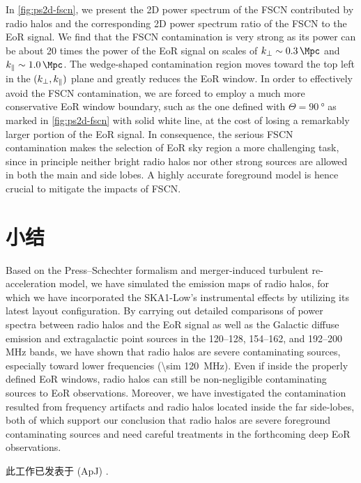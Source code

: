 In \autoref{fig:ps2d-fscn}, we present the 2D power spectrum of the FSCN
contributed by radio halos and the corresponding 2D power spectrum ratio
of the FSCN to the EoR signal.
We find that the FSCN contamination is very strong as its power can be
about 20 times the power of the EoR signal on scales of
$\kperp \sim \SI{0.3}{\per\Mpc}$ and $\klos \sim \SI{1.0}{\per\Mpc}$.
The wedge-shaped contamination region moves toward the top left in
the $(k_{\perp}, k_{\parallel})$ plane and greatly reduces the EoR window.
In order to effectively avoid the FSCN contamination, we are forced to
employ a much more conservative EoR window boundary, such as the one
defined with $\Theta = \SI{90}{\degree}$ as marked in
\autoref{fig:ps2d-fscn} with solid white line, at the cost of losing
a remarkably larger portion of the EoR signal.
In consequence,
the serious FSCN contamination makes the selection of EoR sky region
a more challenging task, since in principle neither bright radio halos
nor other strong sources are allowed in both the main and side lobes.
A highly accurate foreground model is hence crucial to mitigate the
impacts of FSCN.


\section{小结}

Based on the Press--Schechter formalism and merger-induced turbulent
re-acceleration model, we have simulated the emission maps of radio halos,
for which we have incorporated the SKA1-Low's instrumental effects by
utilizing its latest layout configuration.
By carrying out detailed comparisons of power spectra between radio halos
and the EoR signal as well as the Galactic diffuse emission and
extragalactic point sources in the \numrange{120}{128},
\numrange{154}{162}, and \numrange{192}{200} \si{\MHz} bands,
we have shown that radio halos are severe contaminating sources,
especially toward lower frequencies (\SI{\sim 120}{\MHz}).
Even if inside the properly defined EoR windows, radio halos can still
be non-negligible contaminating sources to EoR observations.
Moreover, we have investigated the contamination resulted from
frequency artifacts and radio halos located inside the far side-lobes,
both of which support our conclusion that radio halos are severe
foreground contaminating sources and need careful treatments in the
forthcoming deep EoR observations.

此工作已发表于 \apj{} (ApJ) \cite{li.halo}.



